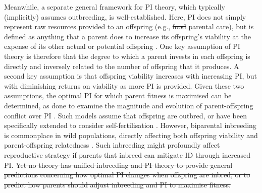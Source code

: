 \documentclass[12pt]{article}
\begin{document}
Meanwhile, a separate general framework for PI theory, which typically (implicitly) assumes outbreeding, is well-established. Here, PI does not simply represent raw resources provided to an offspring (e.g., {\color{red}\st{food}} {\color{blue}parental care}), but is defined as anything that a parent does to increase its offspring's viability at the expense of its other actual or potential offspring \cite[][]{Trivers1972, Trivers1974}. One key assumption of PI theory is therefore that the degree to which a parent invests in each offspring is directly and inversely related to the number of offspring that it produces. A second key assumption is that offspring viability increases with increasing PI, but with diminishing returns on viability as more PI is provided. Given these two assumptions, the optimal PI for which parent fitness is maximised can be determined, as done to examine the magnitude and evolution of parent-offspring conflict over PI \cite[][]{Macnair1978, Parker1978, Parker1985, DeJong2005, Kuijper2012}. Such models assume that offspring are outbred, or have been specifically extended to consider self-fertilisation \cite[][]{DeJong2005}. However, biparental inbreeding is commonplace in wild populations, directly affecting both offspring viability and parent-offspring relatedness \cite[][]{Trivers1974, Lynch1998, OGrady2006, Charlesworth2009, Reid2016}. Such inbreeding might profoundly affect reproductive strategy if parents that inbreed can mitigate ID through increased PI. {\color{red}\st{Yet no theory has unified inbreeding and PI theory to provide general predictions concerning how optimal PI changes when offspring are inbred, or to predict how parents should adjust inbreeding and PI to maximise fitness.}} 
\end{document}

